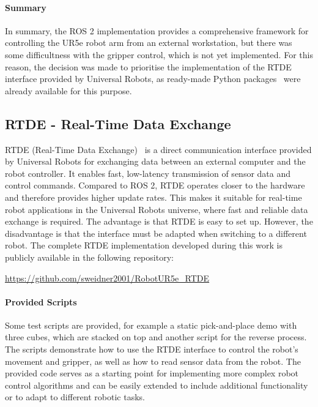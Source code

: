 \paragraph{Summary}
In summary, the ROS 2 implementation provides a comprehensive framework for controlling the UR5e robot arm from an external workstation, but there was some difficultness with the gripper control, which is not yet implemented. For this reason, the decision was made to prioritise the implementation of the RTDE interface provided by Universal Robots, as ready-made Python packages~\cite{WelcomePythonorg2026} were already available for this purpose. 






\subsection{RTDE - Real-Time Data Exchange}
RTDE (Real-Time Data Exchange)~\cite{RealTimeDataExchange} is a direct communication interface provided by Universal Robots for exchanging data between an external computer and the robot controller. It enables fast, low-latency transmission of sensor data and control commands. Compared to ROS 2, RTDE operates closer to the hardware and therefore provides higher update rates. This makes it suitable for real-time robot applications in the Universal Robots universe, where fast and reliable data exchange is required. The advantage is that RTDE is easy to set up. However, the disadvantage is that the interface must be adapted when switching to a different robot.
The complete RTDE implementation developed during this work is publicly available in the following repository:
\begin{center}
    \url{https://github.com/sweidner2001/RobotUR5e_RTDE}
\end{center}





\paragraph{Provided Scripts}
Some test scripts are provided, for example a static pick-and-place demo with three cubes, which are stacked on top and another script for the reverse process. The scripts demonstrate how to use the RTDE interface to control the robot's movement and gripper, as well as how to read sensor data from the robot. The provided code serves as a starting point for implementing more complex robot control algorithms and can be easily extended to include additional functionality or to adapt to different robotic tasks. 



